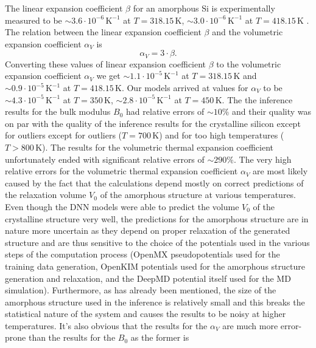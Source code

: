 The linear expansion coefficient $\beta$ for an amorphous Si is experimentally
measured to be $\sim 3.6 \cdot 10^{-6} \, \mathrm{K}^{-1}$ at
$T = 318.15 \, \mathrm{K}$, $\sim 3.0 \cdot 10^{-6} \, \mathrm{K}^{-1}$ at
$T = 418.15 \, \mathrm{K}$ \cite{TAKIMOTO2002314}. The relation between the
linear expansion coefficient $\beta$ and the volumetric expansion coefficient
$\alpha_V$ is
\begin{equation}
  \alpha_V = 3 \cdot \beta.
\end{equation}
Converting these values of linear expansion coefficient $\beta$ to the
volumetric expansion coefficient $\alpha_V$ we get
$\sim 1.1 \cdot 10^{-5} \, \mathrm{K}^{-1}$ at $T = 318.15 \, \mathrm{K}$ and
$\sim 0.9 \cdot 10^{-5} \, \mathrm{K}^{-1}$ at $T = 418.15 \, \mathrm{K}$.
Our models arrived at values for $\alpha_V$ to be
$\sim 4.3 \cdot 10^{-5} \, \mathrm{K}^{-1}$ at
$T = 350 \, \mathrm{K}$, $\sim 2.8 \cdot 10^{-5} \, \mathrm{K}^{-1}$ at
$T = 450 \, \mathrm{K}$. The the inference results for the bulk modulus $B_0$ had
relative errors of $\sim 10 \%$ and their quality was on par with the quality
of the inference results for the crystalline silicon except for outliers
except for outliers ($T = 700 \, \mathrm{K}$) and for too high temperatures
($T > 800 \, \mathrm{K}$). The results for the volumetric thermal expansion
coefficient unfortunately ended with significant relative errors of
$\sim 290 \%$. The very high relative errors for the volumetric
thermal expansion coefficient $\alpha_V$ are most likely caused by the fact
that the calculations depend mostly on correct predictions of the relaxation
volume $V_0$ of the amorphous structure at various temperatures. Even though
the DNN models were able to predict the volume $V_0$ of the crystalline
structure very well, the predictions for the amorphous structure are in nature
more uncertain as they depend on proper relaxation of the generated structure
and are thus sensitive to the choice of the potentials used in the
various steps of the computation process (OpenMX pseudopotentials used for
the training data generation, OpenKIM potentials used for the amorphous
structure generation and relaxation, and the DeepMD potential itself used for
the MD simulation). Furthermore, as has already been mentioned, the size of
the amorphous structure used in the inference is relatively small and this
breaks the statistical nature of the system and causes the results to be noisy
at higher temperatures. It's also obvious that the results for the $\alpha_V$
are much more error-prone than the results for the $B_0$ as the former is
